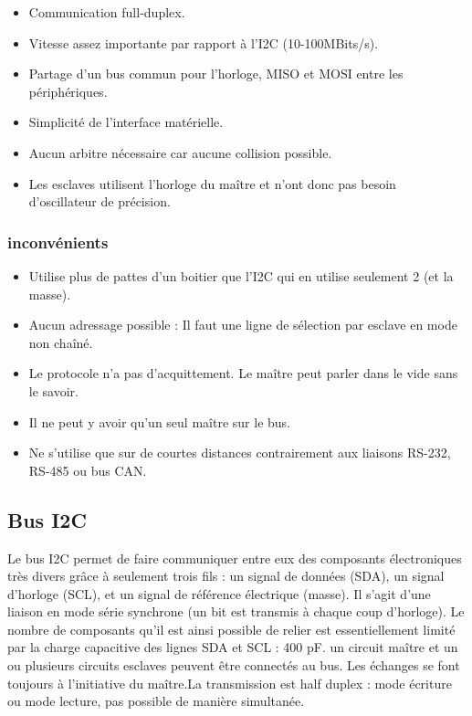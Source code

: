 \documentclass[french,a4paper,12pt]{report}
\begin{document}
			\begin{itemize}
			\item Communication full-duplex.
			\item Vitesse assez importante par rapport à l’I2C (10-100MBits/s).
			\item Partage d’un bus commun pour l’horloge, MISO et MOSI entre les périphériques.
			\item Simplicité de l’interface matérielle.
			\item Aucun arbitre nécessaire car aucune collision possible.
			\item Les esclaves utilisent l’horloge du maître et n’ont donc pas besoin d’oscillateur de précision.
			\end{itemize}
 
  		\subsubsection{inconvénients}
 
			\begin{itemize}
			\item Utilise plus de pattes d’un boitier que l’I2C qui en utilise seulement 2 (et la masse).
			\item Aucun adressage possible : Il faut une ligne de sélection par esclave en mode non chaîné.
			\item Le protocole n’a pas d’acquittement. Le maître peut parler dans le vide sans le savoir.
			\item Il ne peut y avoir qu’un seul maître sur le bus.
			\item Ne s’utilise que sur de courtes distances contrairement aux liaisons RS-232, RS-485 ou bus CAN.
			\end{itemize}
 
 
 			\subsection{Bus I2C}
 			
 			Le bus I2C permet de faire communiquer entre eux des composants électroniques très divers grâce à seulement trois fils : un signal de données (SDA), un signal d'horloge (SCL), et un signal de référence électrique (masse).
Il s'agit d'une liaison en mode série synchrone (un bit est transmis à chaque coup d’horloge). Le nombre de composants qu'il est ainsi possible de relier est essentiellement limité par la charge capacitive des lignes SDA et SCL : 400 pF.
un circuit maître et un ou plusieurs circuits esclaves peuvent être connectés au bus. Les échanges se font toujours à l’initiative du maître.La transmission est half duplex : mode écriture ou mode lecture, pas possible de manière simultanée.
 
\end{document}
